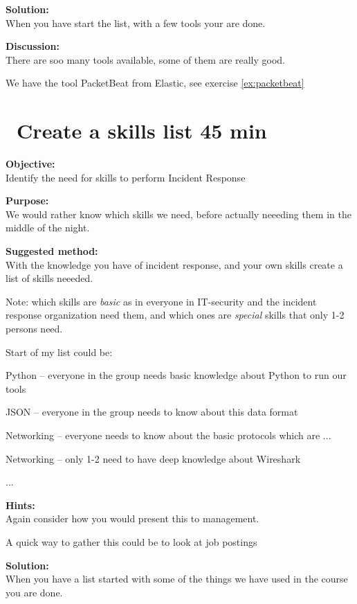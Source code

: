 \documentclass[a4paper,11pt,notitlepage]{report}
\begin{document}
{\bf Solution:}\\
When you have start the list, with a few tools your are done.

{\bf Discussion:}\\
There are soo many tools available, some of them are really good.

We have the tool PacketBeat from Elastic, see exercise \ref{ex:packetbeat}


\chapter{\faExclamationTriangle\ Create a skills list 45 min}
\label{ex:skills-list}



{\bf Objective:}\\
Identify the need for skills to perform Incident Response


{\bf Purpose:}\\
We would rather know which skills we need, before actually neeeding them in the middle of the night.

{\bf Suggested method:}\\
With the knowledge you have of incident response, and your own skills create a list of skills neeeded.

Note: which skills are \emph{basic} as in everyone in IT-security and the incident response organization need them, and which ones are \emph{special} skills that only 1-2 persons need.

Start of my list could be:
\begin{list2}
\item Python -- everyone in the group needs basic knowledge about Python to run our tools
\item JSON -- everyone in the group needs to know about this data format
\item Networking -- everyone needs to know about the basic protocols which are ...
\item Networking -- only 1-2 need to have deep knowledge about Wireshark
\item ...
\end{list2}

{\bf Hints:}\\
Again consider how you would present this to management.

A quick way to gather this could be to look at job postings

{\bf Solution:}\\
When you have a list started with some of the things we have used in the course you are done.
\end{document}
